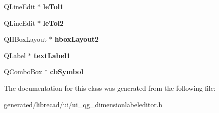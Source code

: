 \begin{DoxyCompactItemize}
\item 
\hypertarget{classUi__QG__DimensionLabelEditor_aee510cda4fb72cf15caa32841a186d1a}{Q\-Line\-Edit $\ast$ {\bfseries le\-Tol1}}\label{classUi__QG__DimensionLabelEditor_aee510cda4fb72cf15caa32841a186d1a}

\item 
\hypertarget{classUi__QG__DimensionLabelEditor_ad205545ef7d861c7fd092edeeaf2b4a8}{Q\-Line\-Edit $\ast$ {\bfseries le\-Tol2}}\label{classUi__QG__DimensionLabelEditor_ad205545ef7d861c7fd092edeeaf2b4a8}

\item 
\hypertarget{classUi__QG__DimensionLabelEditor_a41b62db264835b9e0263f78a09f44613}{Q\-H\-Box\-Layout $\ast$ {\bfseries hbox\-Layout2}}\label{classUi__QG__DimensionLabelEditor_a41b62db264835b9e0263f78a09f44613}

\item 
\hypertarget{classUi__QG__DimensionLabelEditor_ae4abf8232a9e8838c67707aa7144302d}{Q\-Label $\ast$ {\bfseries text\-Label1}}\label{classUi__QG__DimensionLabelEditor_ae4abf8232a9e8838c67707aa7144302d}

\item 
\hypertarget{classUi__QG__DimensionLabelEditor_aa6501a4b3e7560c6f7546eb2c8f70264}{Q\-Combo\-Box $\ast$ {\bfseries cb\-Symbol}}\label{classUi__QG__DimensionLabelEditor_aa6501a4b3e7560c6f7546eb2c8f70264}

\end{DoxyCompactItemize}


The documentation for this class was generated from the following file\-:\begin{DoxyCompactItemize}
\item 
generated/librecad/ui/ui\-\_\-qg\-\_\-dimensionlabeleditor.\-h\end{DoxyCompactItemize}
